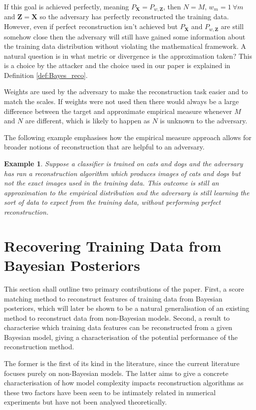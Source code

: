 \documentclass[hyperref]{article}
\theoremstyle{plain}
\newtheorem{example}{Example}[section]
\theoremstyle{remark}
\newcommand{\bX}{\mathbf{X}}
\newcommand{\bZ}{\mathbf{Z}}
\begin{document}
If this goal is achieved perfectly, meaning $P_{\bX} = P_{w,\bZ}$, then $N=M$, $w_{m} = 1\:\forall m$ and $\bZ = \bX$ so the adversary has perfectly reconstructed the training data. However, even if perfect reconstruction isn't achieved but $P_{\bX}$ and $P_{w,\bZ}$ are still somehow close then the adversary will still have gained some information about the training data distribution without violating the mathematical framework. A natural question is in what metric or divergence is the approximation taken? This is a choice by the attacker and the choice used in our paper is explained in Definition \ref{def:Bayes_reco}.

Weights are used by the adversary to make the reconstruction task easier and to match the scales. If weights were not used then there would always be a large difference between the target and approximate empirical measure whenever $M$ and $N$ are different, which is likely to happen as $N$ is unknown to the adversary. 

The following example emphasises how the empirical measure approach allows for broader notions of reconstruction that are helpful to an adversary.

\begin{example}
	Suppose a classifier is trained on cats and dogs and the adversary has ran a reconstruction algorithm which produces images of cats and dogs but not the \textit{exact} images used in the training data. This outcome is still an approximation to the empirical distribution and the adversary is still learning the sort of data to expect from the training data, without performing perfect reconstruction.
\end{example}

\section{Recovering Training Data from Bayesian Posteriors}\label{sec:Bayesian}
This section shall outline two primary contributions of the paper. First, a score matching method to reconstruct features of training data from Bayesian posteriors, which will later be shown to be a natural generalisation of an existing method to reconstruct data from non-Bayesian models. Second, a result to characterise which training data features can be reconstructed from a given Bayesian model, giving a characterisation of the potential performance of the reconstruction method. 

The former is the first of its kind in the literature, since the current literature focuses purely on non-Bayesian models. The latter aims to give a concrete characterisation of how model complexity impacts reconstruction algorithms as these two factors have been seen to be intimately related in numerical experiments but have not been analysed theoretically. 
\end{document}
